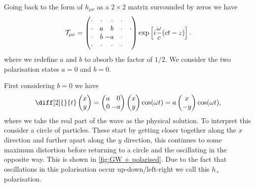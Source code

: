 \documentclass[fleqn]{NotesClass}
\begin{document}
    Going back to the form of \(h_{\mu\nu}\) as a \(2\times 2\) matrix surrounded by zeros we have
    \begin{equation}
        \mathcal{T}_{\mu\nu} = 
        \begin{pmatrix}
            \cdot & \cdot & \cdot & \cdot\\
            \cdot & a & b & \cdot & \cdot\\
            \cdot & b & \mathllap{-}a & \cdot\\
            \cdot & \cdot & \cdot & \cdot
        \end{pmatrix}
        \exp\left[ i\frac{\omega}{c}(ct - z) \right].
    \end{equation}
    where we redefine \(a\) and \(b\) to absorb the factor of \(1/2\).
    We consider the two polarisation states \(a = 0\) and \(b = 0\).
    
    First considering \(b = 0\) we have
    \begin{equation}
        \diff[2]{}{t}
        \begin{pmatrix}
            x\\ y
        \end{pmatrix}
        = 
        \begin{pmatrix}
            a & 0\\
            0 & \mathllap{-}a
        \end{pmatrix}
        \begin{pmatrix}
            x\\ y
        \end{pmatrix}
        \cos(\omega t) = a
        \begin{pmatrix}
            x\\ -y
        \end{pmatrix}
        \cos(\omega t),
    \end{equation}
    where we take the real part of the wave as the physical solution.
    To interpret this consider a circle of particles.
    These start by getting closer together along the \(x\) direction and further apart along the \(y\) direction, this continues to some maximum distortion before returning to a circle and the oscillating in the opposite way.
    This is shown in \cref{fig:GW + polarised}.
    Due to the fact that oscillations in this polarisation occur up-down/left-right we call this \(h_+\) polarisation.
    
\end{document}
